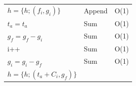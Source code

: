 \documentclass[
  12pt,
  a4paperpaper,
]{report}
\begin{document}
\begin{longtable}[]{@{}lll@{}}
\begin{minipage}[t]{0.52\columnwidth}
\(h = \{h; (f_i, g_i )\}\)\strut
\end{minipage} & \begin{minipage}[t]{0.24\columnwidth}\raggedright
Append\strut
\end{minipage} & \begin{minipage}[t]{0.15\columnwidth}\raggedright
O(1)\strut
\end{minipage}\tabularnewline
\begin{minipage}[t]{0.52\columnwidth}\raggedright
\(t_a = t_a\)\strut
\end{minipage} & \begin{minipage}[t]{0.24\columnwidth}\raggedright
Sum\strut
\end{minipage} & \begin{minipage}[t]{0.15\columnwidth}\raggedright
O(1)\strut
\end{minipage}\tabularnewline
\begin{minipage}[t]{0.52\columnwidth}\raggedright
\(g_f = g_f - g_i\)\strut
\end{minipage} & \begin{minipage}[t]{0.24\columnwidth}\raggedright
Sum\strut
\end{minipage} & \begin{minipage}[t]{0.15\columnwidth}\raggedright
O(1)\strut
\end{minipage}\tabularnewline
\begin{minipage}[t]{0.52\columnwidth}\raggedright
i++\strut
\end{minipage} & \begin{minipage}[t]{0.24\columnwidth}\raggedright
Sum\strut
\end{minipage} & \begin{minipage}[t]{0.15\columnwidth}\raggedright
O(1)\strut
\end{minipage}\tabularnewline
\begin{minipage}[t]{0.52\columnwidth}\raggedright
\(g_i = g_i - g_f\)\strut
\end{minipage} & \begin{minipage}[t]{0.24\columnwidth}\raggedright
Sum\strut
\end{minipage} & \begin{minipage}[t]{0.15\columnwidth}\raggedright
O(1)\strut
\end{minipage}\tabularnewline
\begin{minipage}[t]{0.52\columnwidth}\raggedright
\(h = \{ h; (t_a+C_i, g_f) \}\)\strut
\end{minipage} & \begin{minipage}[t]{0.24\columnwidth}\raggedright

\end{minipage}
\end{longtable}
\end{document}
